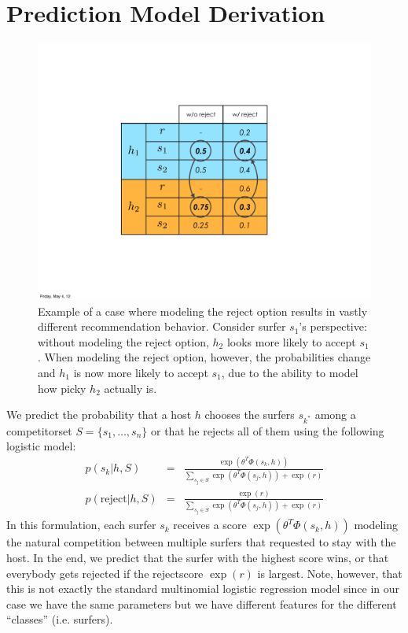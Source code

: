 \section{Prediction Model Derivation}

\begin{figure}[ht]
\centering
\includegraphics[width=0.6\linewidth]{figures/reject_vs_no_reject.pdf}
\caption{
Example of a case where modeling the reject option results in vastly different recommendation behavior.
Consider surfer $s_1$'s perspective: without modeling the reject option, $h_2$ looks more likely to accept $s_1$.
When modeling the reject option, however, the probabilities change and $h_1$ is now more likely to accept $s_1$, due to the ability to model how picky $h_2$ actually is.}
\label{fig:reject_vs_no_reject}
\end{figure}

We predict the probability that a host $h$ chooses the surfers $s_{k^*}$ among a competitorset $S=\{ s_1, \dots, s_n\}$ or that he rejects all of them using the following logistic model:
\begin{eqnarray}
p(s_k | h, S) &=& \frac{\exp(\theta^T \Phi(s_k,h))}{\sum_{s_j \in S} \exp(\theta^T \Phi(s_j,h)) + \exp(r)} \\
p(\text{reject} | h, S) &=& \frac{\exp(r)}{\sum_{s_j \in S} \exp(\theta^T \Phi(s_j,h)) + \exp(r)}
\end{eqnarray}
In this formulation, each surfer $s_k$ receives a score $\exp(\theta^T \Phi(s_k,h))$ modeling the natural competition between multiple surfers that requested to stay with the host. In the end, we predict that the surfer with the highest score wins, or that everybody gets rejected if the rejectscore $\exp{(r)}$ is largest.
Note, however, that this is not exactly the standard multinomial logistic regression model since in our case we have the same parameters but we have different features for the different ``classes'' (i.e. surfers).

